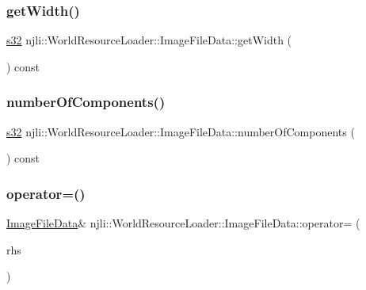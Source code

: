 \subsubsection{\texorpdfstring{get\+Width()}{getWidth()}}
{\footnotesize\ttfamily \mbox{\hyperlink{_util_8h_aa62c75d314a0d1f37f79c4b73b2292e2}{s32}} njli\+::\+World\+Resource\+Loader\+::\+Image\+File\+Data\+::get\+Width (\begin{DoxyParamCaption}{ }\end{DoxyParamCaption}) const}

\mbox{\label{structnjli_1_1_world_resource_loader_1_1_image_file_data_aa129fc2197bbdd87c4fd638046b8a6d6}} 
\subsubsection{\texorpdfstring{number\+Of\+Components()}{numberOfComponents()}}
{\footnotesize\ttfamily \mbox{\hyperlink{_util_8h_aa62c75d314a0d1f37f79c4b73b2292e2}{s32}} njli\+::\+World\+Resource\+Loader\+::\+Image\+File\+Data\+::number\+Of\+Components (\begin{DoxyParamCaption}{ }\end{DoxyParamCaption}) const}

\mbox{\label{structnjli_1_1_world_resource_loader_1_1_image_file_data_ae58cbe419624246b9d5c10fad222b6af}} 
\subsubsection{\texorpdfstring{operator=()}{operator=()}}
{\footnotesize\ttfamily \mbox{\hyperlink{structnjli_1_1_world_resource_loader_1_1_image_file_data}{Image\+File\+Data}}\& njli\+::\+World\+Resource\+Loader\+::\+Image\+File\+Data\+::operator= (\begin{DoxyParamCaption}\item[{const \mbox{\hyperlink{structnjli_1_1_world_resource_loader_1_1_image_file_data}{Image\+File\+Data}} \&}]{rhs }\end{DoxyParamCaption})\hspace{0.3cm}{\ttfamily [private]}}



